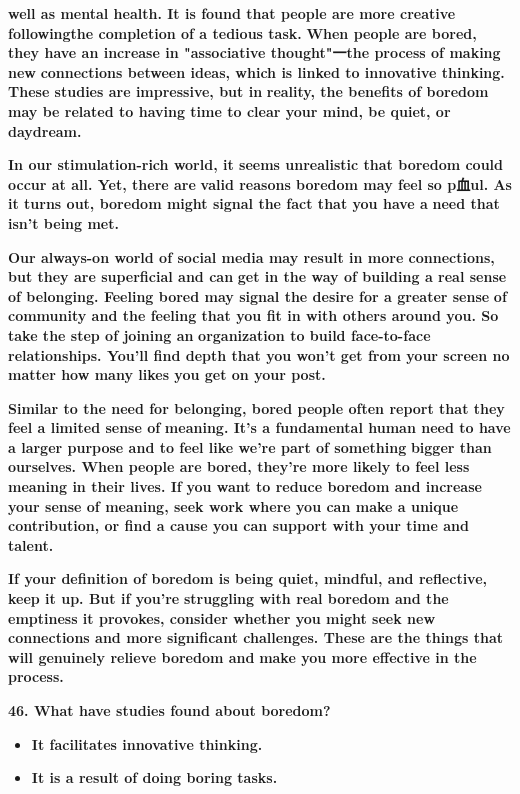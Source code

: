 \documentclass[UTF8,11pt]{ctexart}
\begin{document}
\textbf{well as mental health. It is found that people are more creative following\textperiodcentered{}the completion of a tedious task.} \textbf{When people are bored, they have an increase in "associative thought"一the process of making new} \textbf{connections between ideas, which is linked to innovative thinking. These studies are impressive, but in} \textbf{reality, the benefits of boredom may be related to having time to clear your mind, be quiet, or daydream.}


\textbf{In our stimulation-rich world, it seems unrealistic that boredom could occur at all. Yet, there are} \textbf{valid reasons boredom may feel so p血ul. As it turns out, boredom might signal the fact that you have a} \textbf{need that isn't being met.}


\textbf{Our always-on world of social media may result in more connections, but they are superficial and can} \textbf{get in the way of building a real sense of belonging. Feeling bored may signal the desire for a greater sense} \textbf{of community and the feeling that you fit in with others around you. So take the step of joining an} \textbf{organization to build face-to-face relationships. You'll find depth that you won't get from your screen no} \textbf{matter how many likes you get on your post.}


\textbf{Similar to the need for belonging, bored people often report that they feel a limited sense of} \textbf{meaning. It's a fundamental human need to have a larger purpose and to feel like we're part of something} \textbf{bigger than ourselves. When people are bored, they're more likely to feel less meaning in their lives. If} \textbf{you want to reduce boredom and increase your sense of meaning, seek work where you can make a unique} \textbf{contribution, or find a cause you can support with your time and talent.}


\textbf{If your definition of boredom is being quiet, mindful, and reflective, keep it up. But if you're} \textbf{struggling with real boredom and the emptiness it provokes, consider whether you might seek new} \textbf{connections and more significant challenges. These are the things that will genuinely relieve boredom and} \textbf{make you more effective in the process.}


\textbf{46. What have studies found about boredom?}


\begin{itemize}[leftmargin=2em,itemsep=.2em,topsep=.4em]\item[A.] \textbf{It facilitates innovative thinking.}
\item[B.] \textbf{It is a result of doing boring tasks.}
\end{itemize}
\end{document}
